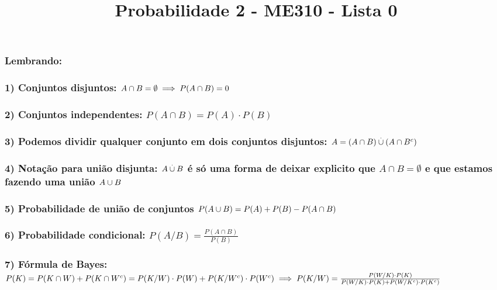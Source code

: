 \documentclass[english]{article}
\begin{document}
\title{Probabilidade 2 - ME310 - Lista 0}

\maketitle

\subsubsection*{Lembrando:}


\subsubsection*{1) Conjuntos disjuntos: $A\cap B=\emptyset\protect\implies P(A\cap B)=0$}


\subsubsection*{2) Conjuntos independentes: $P(A\cap B)=P(A)\cdot P(B)$}


\subsubsection*{3) Podemos dividir qualquer conjunto em dois conjuntos disjuntos:
$A=(A\cap B)\protect\overset{.}{\cup}(A\cap B^{c})$}


\subsubsection*{4) Notação para união disjunta: $A\protect\overset{.}{\cup}B$ é
só uma forma de deixar explicito que $A\cap B=\emptyset$ e que estamos
fazendo uma união $A\protect\overset{}{\cup}B$ }


\subsubsection*{5) Probabilidade de união de conjuntos $P(A\cup B)\protect\overset{}{=}P(A)+P(B)-P(A\cap B)$}


\subsubsection*{6) Probabilidade condicional: $P(A/B)=\frac{P(A\cap B)}{P(B)}$}


\subsubsection*{7) Fórmula de Bayes: $P(K)=P(K\cap W)+P(K\cap W^{c})=P(K/W)\cdot P(W)+P(K/W^{c})\cdot P(W^{c})\protect\implies P(K/W)=\frac{P(W/K)\cdot P(K)}{P(W/K)\cdot P(K)+P(W/K^{c})\cdot P(K^{c})}$}
\end{document}
